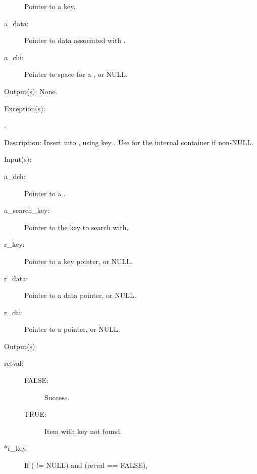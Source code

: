 \begin{capi}
\begin{capilist}
\begin{description}
			Pointer to a key.
		\item[a\_data: ]
			Pointer to data associated with .
		\item[a\_chi: ]
			Pointer to space for a , or NULL.
		\end{description}
	\item[Output(s): ] None.
	\item[Exception(s): ]
		\begin{description}\item[]
		\item[.]
		\end{description}
	\item[Description: ]
		Insert  into , using key
		.  Use  for the internal
		 container if non-NULL.
	\end{capilist}
\label{dch_remove}
	\begin{capilist}
	\item[Input(s): ]
		\begin{description}\item[]
		\item[a\_dch: ]
			Pointer to a .
		\item[a\_search\_key: ]
			Pointer to the key to search with.
		\item[r\_key: ]
			Pointer to a key pointer, or NULL.
		\item[r\_data: ]
			Pointer to a data pointer, or NULL.
		\item[r\_chi: ]
			Pointer to a  pointer, or NULL.
		\end{description}
	\item[Output(s): ]
		\begin{description}\item[]
		\item[retval: ]
			\begin{description}\item[]
			\item[FALSE: ]
				Success.
			\item[TRUE: ]
				Item with key  not	found.
			\end{description}
		\item[*r\_key: ]
			If ( != NULL) and (retval == FALSE),

\end{description}
\end{capilist}
\end{capi}
